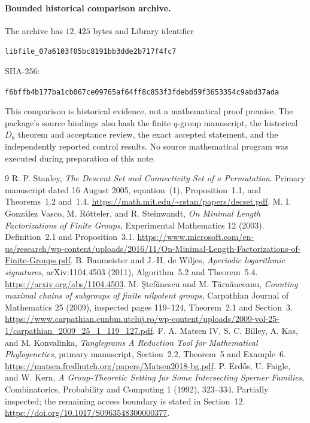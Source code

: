 \documentclass[11pt,letterpaper]{article}
\theoremstyle{definition}
\newcommand{\hash}[1]{{\small\ttfamily\nolinkurl{#1}}}
\begin{document}
\paragraph{Bounded historical comparison archive.}
The archive has $12{,}425$ bytes and Library identifier
\begin{center}\hash{libfile_07a6103f05bc8191bb3dde2b717f4fc7}\end{center} SHA-256:
\begin{center}\hash{f6bffb4b177ba1cb067ce09765af64ff8c853f3fdebd59f3653354c9abd37ada}\end{center}
This comparison is historical evidence, not a mathematical proof premise. The package's source bindings also hash the finite $q$-group manuscript, the historical $D_8$ theorem and acceptance review, the exact accepted statement, and the independently reported control results. No source mathematical program was executed during preparation of this note.

\begin{thebibliography}{9}
 R. P. Stanley, \emph{The Descent Set and Connectivity Set of a Permutation}. Primary manuscript dated 16 August 2005, equation~(1), Proposition~1.1, and Theorems~1.2 and~1.4. \url{https://math.mit.edu/~rstan/papers/decset.pdf}.
 M. I. Gonz\'alez Vasco, M. R\"otteler, and R. Steinwandt, \emph{On Minimal Length Factorizations of Finite Groups}, Experimental Mathematics 12 (2003). Definition~2.1 and Proposition~3.1. \url{https://www.microsoft.com/en-us/research/wp-content/uploads/2016/11/On-Minimal-Length-Factorizations-of-Finite-Groups.pdf}.
 B. Baumeister and J.-H. de Wiljes, \emph{Aperiodic logarithmic signatures}, arXiv:1104.4503 (2011), Algorithm~5.2 and Theorem~5.4. \url{https://arxiv.org/abs/1104.4503}.
 M. \c{S}tef\u{a}nescu and M. T\u{a}rn\u{a}uceanu, \emph{Counting maximal chains of subgroups of finite nilpotent groups}, Carpathian Journal of Mathematics 25 (2009), inspected pages 119--124, Theorem~2.1 and Section~3. \url{https://www.carpathian.cunbm.utcluj.ro/wp-content/uploads/2009-vol-25-1/carpathian_2009_25_1_119_127.pdf}.
 F. A. Matsen IV, S. C. Billey, A. Kas, and M. Konvalinka, \emph{Tanglegrams A Reduction Tool for Mathematical Phylogenetics}, primary manuscript, Section~2.2, Theorem~5 and Example~6. \url{https://matsen.fredhutch.org/papers/Matsen2018-bg.pdf}.
 P. Erd\H{o}s, U. Faigle, and W. Kern, \emph{A Group-Theoretic Setting for Some Intersecting Sperner Families}, Combinatorics, Probability and Computing 1 (1992), 323--334. Partially inspected; the remaining access boundary is stated in Section~12. \url{https://doi.org/10.1017/S0963548300000377}.
\end{thebibliography}
\end{document}
